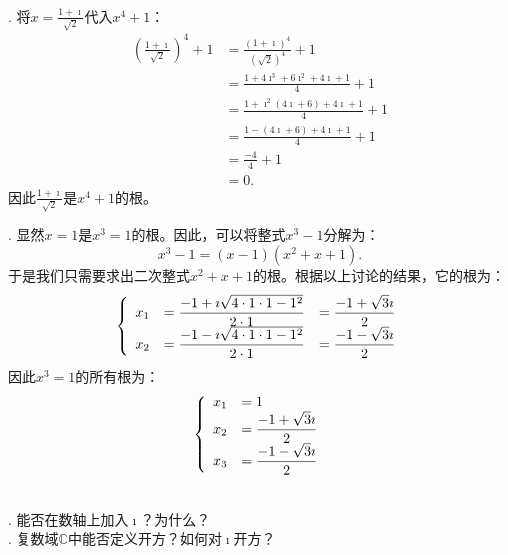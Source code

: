 \documentclass[12pt,UTF8]{ctexbook}
\begin{document}
\begin{so}
    \mbox{} \\
    . 将$x = \displaystyle\frac{1 + \imath}{\sqrt{2}}$代入$x^4 + 1$：
    \begin{align*}
        \left(\frac{1 + \imath}{\sqrt{2}}\right)^4 + 1 &= \frac{\left(1 + \imath\right)^4}{\left(\sqrt{2}\right)^4} + 1 \\
        &= \frac{1 + 4\imath^3 + 6\imath^2 + 4\imath + 1}{4} + 1 \\
        &= \frac{1 + \imath^2 (4\imath + 6) + 4\imath + 1}{4} + 1 \\
        &= \frac{1 - (4\imath + 6) + 4\imath + 1}{4} + 1 \\
        &= \frac{- 4}{4} + 1 \\
        &= 0.
    \end{align*}
    因此$\displaystyle\frac{1 + \imath}{\sqrt{2}}$是$x^4 + 1$的根。

    . 显然$x = 1$是$x^3 = 1$的根。因此，可以将整式$x^3 - 1$分解为：
    $$ x^3 - 1 = (x - 1)(x^2 + x + 1).$$
    于是我们只需要求出二次整式$x^2 + x + 1$的根。根据以上讨论的结果，它的根为：
    $$
    \left\{
        \begin{array}[]{rll}
            x_1 &= \displaystyle\frac{-1 + \imath \sqrt{4\cdot 1\cdot 1 - 1^2} }{2\cdot 1} &= \displaystyle\frac{-1 + \sqrt{3}\imath}{2} \\
            x_2 &= \displaystyle\frac{-1 - \imath \sqrt{4\cdot 1\cdot 1 - 1^2} }{2\cdot 1} &= \displaystyle\frac{-1 - \sqrt{3}\imath}{2} \\
        \end{array}
    \right.
    $$
    因此$x^3 = 1$的所有根为：
    $$
    \left\{
        \begin{array}[]{rl}
            x_1 &= 1 \\
            x_2 &= \displaystyle\frac{-1 + \sqrt{3}\imath}{2} \\
            x_3 &= \displaystyle\frac{-1 - \sqrt{3}\imath}{2} \\
        \end{array}
    \right.
    $$
\end{so}

\begin{sk}
    \mbox{} \\
    . 能否在数轴上加入$\imath$？为什么？\\
    . 复数域$\mathbb{C}$中能否定义开方？如何对$\imath$开方？
\end{sk}
\end{document}
